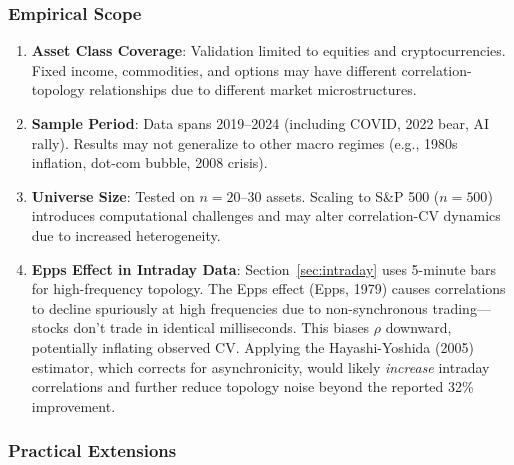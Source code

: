\subsubsection{Empirical Scope}

\begin{enumerate}
\item \textbf{Asset Class Coverage}: Validation limited to equities and cryptocurrencies. Fixed income, commodities, and options may have different correlation-topology relationships due to different market microstructures.

\item \textbf{Sample Period}: Data spans 2019--2024 (including COVID, 2022 bear, AI rally). Results may not generalize to other macro regimes (e.g., 1980s inflation, dot-com bubble, 2008 crisis).

\item \textbf{Universe Size}: Tested on $n = 20$--30 assets. Scaling to S\&P 500 ($n = 500$) introduces computational challenges and may alter correlation-CV dynamics due to increased heterogeneity.

\item \textbf{Epps Effect in Intraday Data}: Section~\ref{sec:intraday} uses 5-minute bars for high-frequency topology. The Epps effect (Epps, 1979) causes correlations to decline spuriously at high frequencies due to non-synchronous trading---stocks don't trade in identical milliseconds. This biases $\rho$ downward, potentially inflating observed CV. Applying the Hayashi-Yoshida (2005) estimator, which corrects for asynchronicity, would likely \textit{increase} intraday correlations and further reduce topology noise beyond the reported 32\% improvement.
\end{enumerate}

\subsubsection{Practical Extensions}

